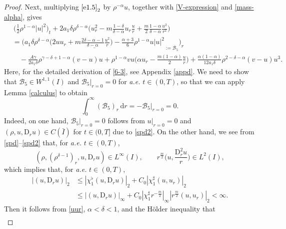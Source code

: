 \documentclass[11pt,reqno]{amsart}
\numberwithin{rk}{section}
\numberwithin{prop}{section}
\numberwithin{mydef}{section}
\numberwithin{lem}{section}
\numberwithin{equation}{section}
\numberwithin{thm}{section}
\begin{document}
\begin{proof}
Next, multiplying $\eqref{e1.5}_2$ by $\rho^{-\alpha}u$, together with \eqref{V-expression} and \eqref{mass-alpha}, gives
\begin{equation}\label{6-3}
\!\!\!\!\begin{aligned}
&\,\big(\frac{1}{2}\rho^{1-\alpha}|u|^2\big)_t+2a_1\delta\rho^{\delta-\alpha}\Big(u_r^2-m\frac{1-\delta}{\delta-\alpha}u_r\frac{u}{r}+\frac{m}{2}\frac{1-\alpha}{\delta-\alpha}\frac{u^2}{r^2}\Big)\\
&=\Big(\underline{a_1\delta\rho^{\delta-\alpha}\big(2uu_r+m\frac{2\delta-\alpha-1}{\delta-\alpha}\frac{u^{2}}{r}\big)-\frac{\alpha+3}{6}\rho^{1-\alpha}u|u|^2}_{:=\mathcal{B}_5}\Big)_r\\
&\quad\!-\frac{A\gamma}{2a_1\delta}\rho^{\gamma-\delta+1-\alpha}(v-u)u+\rho^{1-\alpha}vu\Big(\alpha u_r-\frac{m(1-\alpha)}{2}\frac{u}{r}\Big)+\frac{\alpha(1-\alpha)}{12a_1\delta}\rho^{2-\delta-\alpha}(v-u)u^{3}\!.
\end{aligned}
\end{equation}
Here, for the detailed derivation of \eqref{6-3}, see Appendix \ref{appd}. We need to show that $\mathcal{B}_5\in W^{1,1}(I)$ and $\mathcal{B}_5|_{r=0}=0$ for \textit{a.e.} $t\in (0,T)$, so that we can apply Lemma \ref{calculus} to obtain
\begin{equation}\label{int-B5}
\int_0^\infty (\mathcal{B}_5)_r\,\mathrm{d}r=-\mathcal{B}_5|_{r=0}=0.
\end{equation}
Indeed, on one hand, $\mathcal{B}_5|_{r=0}=0$ follows from $u|_{r=0}=0$ and $(\rho,u,\mathrm{D}_r u)\in C(\bar I)$ for $t\in (0,T]$ due to \eqref{spd2}. On the other hand, we see from \eqref{spd}--\eqref{spd2} that, for \textit{a.e.} $t\in (0,T)$,
\begin{equation*}
(\rho,(\rho^{\delta-1})_r,u,\mathrm{D}_r u)\in L^\infty(I),\qquad r^\frac{m}{2}\big(u,\frac{\mathrm{D}_r^2 u}{r}\big)\in L^2(I),
\end{equation*}
which implies that, for \textit{a.e.} $t\in (0,T)$,
\begin{equation}\label{uur}
\begin{aligned}
|(u,\mathrm{D}_r u)|_2&\leq  |\chi_1^\flat (u,\mathrm{D}_r u)|_2+C_0|\chi_1^\sharp(u,u_r)|_2\\
&\leq |(u,\mathrm{D}_r u)|_\infty+C_0|\chi_1^\sharp r^{-\frac{m}{2}}|_\infty |r^\frac{m}{2}(u,u_r)|_2<\infty.
\end{aligned}
\end{equation}
Then it follows from \eqref{uur}, $\alpha<\delta<1$, and the H\"older inequality that
\begin{align*}

\end{align*}
\end{proof}
\end{document}
